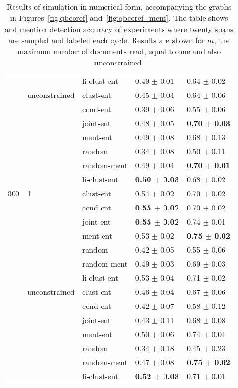 \begin{table*}
\begin{tabular}{lllll}
    &               & li-clust-ent &  0.49 $\pm$ 0.01 &  0.64 $\pm$ 0.02 \\
    \cline{2-5}
    & unconstrained & clust-ent &  0.45 $\pm$ 0.04 &  0.64 $\pm$ 0.06 \\
    &               & cond-ent &  0.39 $\pm$ 0.06 &  0.55 $\pm$ 0.06 \\
    &               & joint-ent &  0.48 $\pm$ 0.05 &  \textbf{0.70 $\pm$ 0.03} \\
    &               & ment-ent &  0.49 $\pm$ 0.08 &  0.68 $\pm$ 0.13 \\
    &               & random &  0.34 $\pm$ 0.08 &  0.50 $\pm$ 0.11 \\
    &               & random-ment &  0.49 $\pm$ 0.04 &  \textbf{0.70 $\pm$ 0.01} \\
    &               & li-clust-ent &  \textbf{0.50 $\pm$ 0.03} &  0.68 $\pm$ 0.02 \\
    \cline{1-5}
300 & 1 & clust-ent &  0.54 $\pm$ 0.02 &  0.70 $\pm$ 0.02 \\
    &               & cond-ent &  \textbf{0.55 $\pm$ 0.02} &  0.70 $\pm$ 0.02 \\
    &               & joint-ent &  \textbf{0.55 $\pm$ 0.02} &  0.74 $\pm$ 0.01 \\
    &               & ment-ent &  0.53 $\pm$ 0.02 &  \textbf{0.75 $\pm$ 0.02} \\
    &               & random &  0.42 $\pm$ 0.05 &  0.55 $\pm$ 0.06 \\
    &               & random-ment &  0.49 $\pm$ 0.03 &  0.69 $\pm$ 0.03 \\
    &               & li-clust-ent &  0.53 $\pm$ 0.04 &  0.71 $\pm$ 0.02 \\
    \cline{2-5}
    & unconstrained & clust-ent &  0.46 $\pm$ 0.04 &  0.67 $\pm$ 0.06 \\
    &               & cond-ent &  0.42 $\pm$ 0.07 &  0.58 $\pm$ 0.12 \\
    &               & joint-ent &  0.43 $\pm$ 0.11 &  0.68 $\pm$ 0.08 \\
    &               & ment-ent &  0.50 $\pm$ 0.06 &  0.74 $\pm$ 0.04 \\
    &               & random &  0.34 $\pm$ 0.18 &  0.45 $\pm$ 0.23 \\
    &               & random-ment &  0.47 $\pm$ 0.08 &  \textbf{0.75 $\pm$ 0.02} \\
    &               & li-clust-ent &  \textbf{0.52 $\pm$ 0.03} &  0.71 $\pm$ 0.01 \\
\bottomrule
\end{tabular}
\caption{Results of \qbcoref{} simulation in numerical form, accompanying the
    graphs in Figures~\ref{fig:qbcoref} and~\ref{fig:qbcoref_ment}. The table
    shows \avgfone{} and mention detection accuracy of experiments where twenty
    spans are sampled and labeled each cycle. Results are shown for $m$, the
    maximum number of documents read, equal to one and also unconstrained.}
\label{tab:qb_num}
\end{table*}
